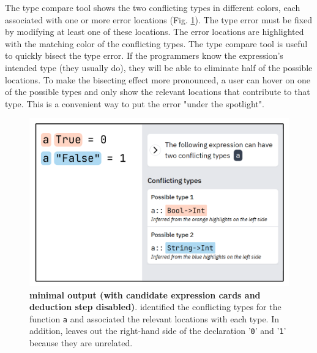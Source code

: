 The type compare tool shows the two conflicting types in different colors, each associated with one or more error locations (Fig. \ref{fig:compare}).  The type error must be fixed by modifying at least one of these locations. The error locations are highlighted with the matching color of the conflicting types. The type compare tool is useful to quickly bisect the type error. If the programmers know the expression's intended type (they usually do), they will be able to eliminate half of the possible locations. To make the bisecting effect more pronounced, a user can hover on one of the possible types and only show the relevant locations that
contribute to that type. This is a convenient way to put the error "under the spotlight".


\begin{figure}[h]
    \centering
    \includegraphics[width=\linewidth]{images/intro-compare.pdf}
    \caption{
        \textbf{\chameleon{} minimal output (with candidate expression cards and deduction step disabled)}. \chameleon{} identified the conflicting types for the function \texttt{a} and associated the relevant locations with each type. In addition, \chameleon{} leaves out the right-hand side of the declaration '\texttt{0}' and '\texttt{1}' because they are unrelated.
}
    \label{fig:compare}
\end{figure}

